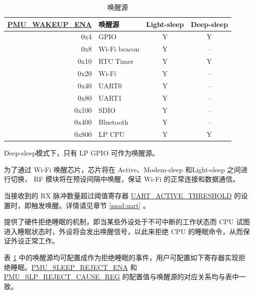 \documentclass[main\_\_CN.tex]{subfiles}
\begin{document}
\begin{table}[H]
    \centering
    \caption{唤醒源}
    \label{tab:lowpowm-wakeup-source}
    \begin{threeparttable}
    \begin{tabular}{| r | l | c | c |}
    \hline
    \rowcolor{lightgray}
    \textbf{\hyperref[fielddesc:PMUWAKEUPENA]{PMU\_WAKEUP\_ENA}} & \textbf{唤醒源} &  \textbf{Light-sleep} & \textbf{Deep-sleep}  \\\hline
    0x4 & GPIO\tnote{1} & Y & Y \\\hline
    0x8 & Wi-Fi beacon  & Y & – \\\hline
    0x10 & RTC Timer  & Y & Y \\\hline
    0x20 & Wi-Fi\tnote{2} & Y & – \\\hline
    0x40 & UART0\tnote{3} & Y & – \\\hline
    0x80 & UART1\tnote{3} & Y & – \\\hline
    0x100 & SDIO & Y & – \\\hline
    0x400 & Bluetooth & Y & – \\\hline
    0x800 & LP CPU  & Y & Y \\\hline
    \end{tabular}

\begin{tablenotes}
    \item[1] Deep-sleep模式下，只有 LP GPIO 可作为唤醒源。

    \item[2] 为了通过 Wi-Fi 唤醒芯片，芯片将在 Active、Modem-sleep 和Light-sleep 之间进行切换， RF 模块将在预设间隔中唤醒，保证 Wi-Fi 的正常连接和数据通信。

    \item[3] 当接收到的 RX 脉冲数量超过阈值寄存器 \hyperref[fielddesc:UARTACTIVETHRESHOLD]{UART\_ACTIVE\_THRESHOLD} 的设置时，即触发唤醒。详情请见章节 \ref{mod:uart} \textit{}。

    \end{tablenotes}
    \end{threeparttable}
\end{table}

\chipname{} 提供了硬件拒绝睡眠的机制，即当某些外设处于不可中断的工作状态而 CPU 试图进入睡眠状态时，外设将会发出唤醒信号，以此来拒绝 CPU 的睡眠命令，从而保证外设正常工作。

表 \ref{tab:lowpowm-wakeup-source} 中的唤醒源均可配置成作为拒绝睡眠的事件，用户可配置如下寄存器实现拒绝睡眠。\hyperref[fielddesc:PMUSLEEPREJECTENA]{PMU\_SLEEP\_REJECT\_ENA} 和 \hyperref[fielddesc:PMUREJECTCAUSE]{PMU\_SLP\_REJECT\_CAUSE\_REG} 的配置值与唤醒源的对应关系均与表中一致。
\end{document}
